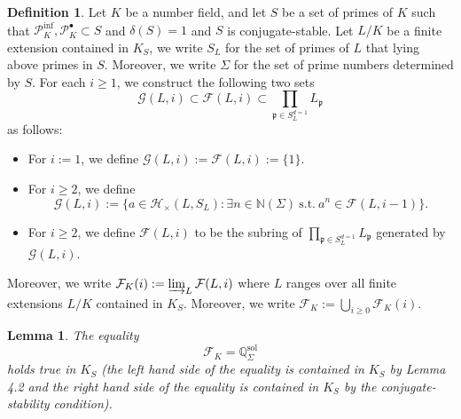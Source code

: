 \documentclass{article}
\theoremstyle{plain}
\newtheorem{lem}[thm]{Lemma}
\theoremstyle{definition}
\newtheorem{defn}[thm]{Definition}
\theoremstyle{remark}
\begin{document}
\begin{defn}
Let $K$ be a number field, and let $S$ be a set of primes of $K$ such that $\mathscr{P}_K^{\text{inf}},\mathscr{P}_K^{\bullet} \subset S$ and $\delta(S) = 1$ and $S$ is conjugate-stable. Let $L/K$ be a finite extension contained in $K_S$, we write $S_L$ for the set of primes of $L$ that lying above primes in $S$. Moreover, we write $\Sigma$ for the set of prime numbers determined by $S$. For each $i \geq 1$, we construct the following two sets
$$
\mathcal{G}(L,i) \subset \mathcal{F}(L,i) \subset \prod_{\mathfrak{p} \in S_L^{d=1}} L_{\mathfrak{p}}
$$
as follows:
\begin{itemize}
\item For $i := 1$, we define $\mathcal{G}(L,i) := \mathcal{F}(L,i) := \{1\}$.
\item For $i \geq 2$, we define
$$
\mathcal{G}(L,i) := \{a \in \mathcal{H}_{\times}(L,S_L): \exists n \in \mathbb N(\Sigma)~\text{s.t.}~a^n \in \mathcal{F}(L,i-1)\}.
$$
\item For $i \geq 2$, we define $\mathcal{F}(L,i)$ to be the subring of $\prod_{\mathfrak{p} \in S_L^{d=1}} L_{\mathfrak{p}}$ generated by $\mathcal{G}(L,i)$.
\end{itemize}
Moreover, we write $\mathcal{F}_K(i) := \varinjlim_L \mathcal{F}(L,i)$ where $L$ ranges over all finite extensions $L/K$ contained in $K_S$. Moreover, we write $\mathcal{F}_K := \bigcup_{i \geq 0} \mathcal{F}_K(i)$.
\end{defn}
\begin{lem}
The equality
$$
\mathcal{F}_K = \mathbb Q_{\Sigma}^{\text{sol}}
$$
holds true in $K_S$ (the left hand side of the equality is contained in $K_S$ by Lemma 4.2 and the right hand side of the equality is contained in $K_S$ by the conjugate-stability condition).
\end{lem}
\end{document}
